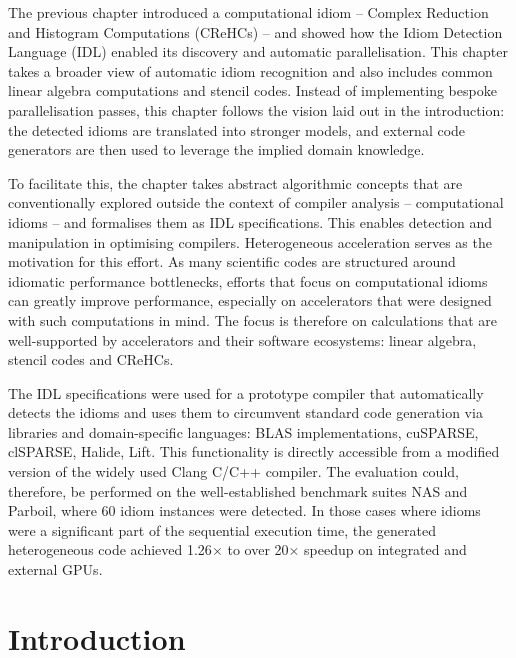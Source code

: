 
    The previous chapter introduced a computational idiom --
    Complex Reduction and Histogram Computations (CReHCs) -- and showed how the
    Idiom Detection Language (IDL) enabled its discovery and automatic
    parallelisation.
    This chapter takes a broader view of automatic idiom recognition and also
    includes common linear algebra computations and stencil codes.
    Instead of implementing bespoke parallelisation passes, this chapter
    follows the vision laid out in the introduction:
    the detected idioms are translated into stronger models, and external
    code generators are then used to leverage the implied domain knowledge.

    To facilitate this, the chapter takes abstract algorithmic concepts that are
    conventionally explored outside the context of compiler analysis --
    computational idioms -- and formalises them as IDL specifications.
    This enables detection and manipulation in optimising compilers.
    Heterogeneous acceleration serves as the motivation for this effort.
    As many scientific codes are structured around idiomatic performance
    bottlenecks, efforts that focus on computational idioms can greatly
    improve performance, especially on accelerators that were designed
    with such computations in mind.
    The focus is therefore on calculations that are well-supported by
    accelerators and their software ecosystems: linear algebra,
    stencil codes and CReHCs.

    The IDL specifications were used for a prototype compiler that
    automatically detects the idioms and uses them to circumvent standard
    code generation via libraries and domain-specific languages:
    BLAS implementations, cuSPARSE, clSPARSE, Halide, Lift.
    This functionality is directly accessible from a modified version of the
    widely used Clang C/C++ compiler.
    The evaluation could, therefore, be performed on the well-established
    benchmark suites NAS and Parboil, where 60 idiom instances were detected.
    In those cases where idioms were a significant part of the sequential
    execution time, the generated heterogeneous code achieved 1.26$\times$ to
    over 20$\times$ speedup on integrated and external GPUs.

\section{Introduction}

